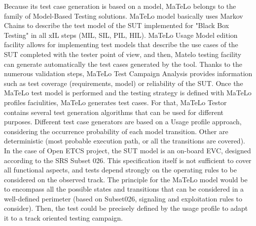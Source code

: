 \documentclass{template/openetcs_report}
\begin{document}
Because its test case generation is based on a model, MaTeLo belongs to the family of
 Model-Based Testing solutions. MaTeLo model basically uses Markov Chains to describe 
the test model of the SUT implemented for "Black Box Testing" in all xIL steps (MIL, SIL, PIL, HIL).
MaTeLo Usage Model edition facility allows for implementing test models that describe the use
 cases of the SUT completed with the tester point of view, and then, Matelo testing facility 
can generate automatically the test cases generated by the tool.
Thanks to the numerous validation steps, MaTeLo Test Campaign Analysis provides information
 such as test coverage (requirements, model) or reliability of the SUT.
Once the MaTeLo test model is performed and the testing strategy is defined with MaTeLo profiles
 faciulities, MaTeLo generates test cases. For that, MaTeLo Testor contains several test generation 
algorithms that can be used for different purposes. Different test case generators are based on a
 Usage profile approach, considering the occurrence probability of each model transition. Other are
 deterministic (most probable execution path, or all the transitions are covered). 
In the case of Open ETCS project, the SUT model is an on-board EVC, designed according to the 
SRS Subset 026. This specification itself is not sufficient to cover all functional aspects, and tests 
depend strongly on the operating rules to be considered on the observed track. The principle 
for the MaTeLo model would be to encompass all the possible states and transitions that can 
be considered in a well-defined perimeter (based on Subset026, signaling and exploitation
 rules to consider). Then, the test could be precisely defined by the usage profile to adapt 
it to a track oriented testing campaign.
\end{document}
